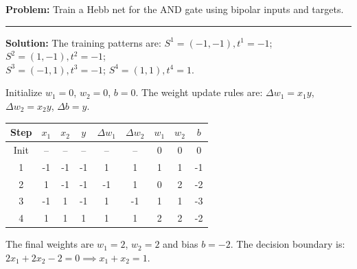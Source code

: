 \documentclass[12pt,a4paper]{article}
\renewcommand{\arraystretch}{1.45}
\begin{document}
\begin{tcolorbox}[examplebox, title={Hebb Net Weight Calculation}]
\textbf{Problem:} Train a Hebb net for the AND gate using bipolar inputs and targets.
\par\vspace{4pt}\noindent\rule{\linewidth}{0.5pt}\par
\textbf{Solution:}
The training patterns are:
$S^1 = (-1, -1), t^1 = -1$; \quad $S^2 = (1, -1), t^2 = -1$; \\
$S^3 = (-1, 1), t^3 = -1$; \quad $S^4 = (1, 1), t^4 = 1$.
\par\noindent
Initialize $w_1 = 0$, $w_2 = 0$, $b = 0$.
The weight update rules are: $\Delta w_1 = x_1 y$, $\Delta w_2 = x_2 y$, $\Delta b = y$.
\par\vspace{4pt}
\centering
{\renewcommand{\arraystretch}{1.65}%
\begin{tabular}{|c|c|c|c|c|c|c|c|c|}\hline
Step & $x_1$ & $x_2$ & $y$ & $\Delta w_1$ & $\Delta w_2$ & $w_1$ & $w_2$ & $b$ \\[4pt]
\hline
Init & -- & -- & -- & -- & -- & 0 & 0 & 0 \\
\hline
1 & -1 & -1 & -1 & 1 & 1 & 1 & 1 & -1 \\
\hline
2 & 1 & -1 & -1 & -1 & 1 & 0 & 2 & -2 \\
\hline
3 & -1 & 1 & -1 & 1 & -1 & 1 & 1 & -3 \\
\hline
4 & 1 & 1 & 1 & 1 & 1 & 2 & 2 & -2 \\
\hline
\end{tabular}
}
\par\vspace{4pt}\flushleft
The final weights are $w_1 = 2$, $w_2 = 2$ and bias $b = -2$.
The decision boundary is: $2 x_1 + 2 x_2 - 2 = 0 \implies x_1 + x_2 = 1$.
\end{tcolorbox}
\end{document}
